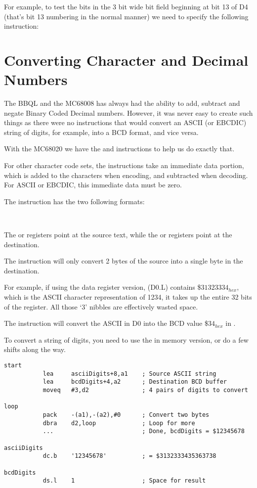 For example, to test the bits in the 3 bit wide bit field beginning at bit 13 of D4 (that's bit 13 numbering in the normal manner) we need to specify the following instruction:




\section{Converting Character and Decimal Numbers}

The BBQL and the MC68008 has always had the ability to add, subtract and negate Binary Coded Decimal numbers. However, it was never easy to create such things as there were no instructions that would convert an ASCII (or EBCDIC) string of digits, for example, into a BCD format, and vice versa.

With the MC68020 we have the  and  instructions to help us do exactly that.

For other character code sets, the instructions take an immediate data portion, which is added to the characters when encoding, and subtracted when decoding. For ASCII or EBCDIC, this immediate data must be zero.

The  instruction has the two following formats:

\\

The  or  registers point at the source text, while the  or  registers point at the destination.

The instruction will only convert 2 bytes of the source into a single byte in the destination.

For example, if using the data register version, \opcode(D0.L) contains \$$31323334_{hex}$, which is the ASCII character representation of 1234, it takes up the entire 32 bits of the register. All those `3' nibbles are effectively wasted space.

The instruction  will convert the ASCII in D0 into the BCD value \$$34_{hex}$ in . 

To convert a string of digits, you need to use the in memory version, or do a few shifts along the way.

\begin{lstlisting}[firstnumber=1,caption={Example of the PACK instruction}]
start
           lea     asciiDigits+8,a1    ; Source ASCII string
           lea     bcdDigits+4,a2      ; Destination BCD buffer
           moveq   #3,d2               ; 4 pairs of digits to convert
           
loop
           pack    -(a1),-(a2),#0      ; Convert two bytes
           dbra    d2,loop             ; Loop for more
           ...                         ; Done, bcdDigits = $12345678
           
asciiDigits
           dc.b    '12345678'          ; = $3132333435363738
           
bcdDigits
           ds.l    1                   ; Space for result
\end{lstlisting}

